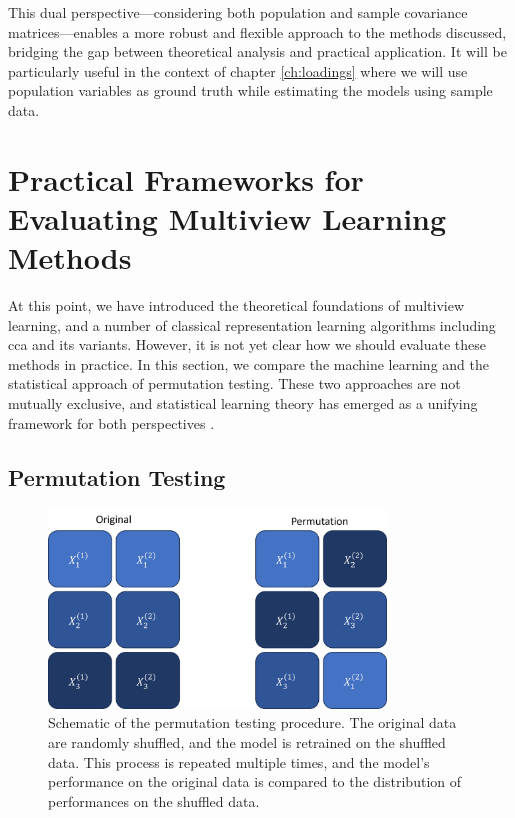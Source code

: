 This dual perspective—considering both population and sample covariance matrices—enables a more robust and flexible approach to the methods discussed, bridging the gap between theoretical analysis and practical application.
It will be particularly useful in the context of chapter \ref{ch:loadings} where we will use population variables as ground truth while estimating the models using sample data.


\section{Practical Frameworks for Evaluating Multiview Learning Methods}

At this point, we have introduced the theoretical foundations of multiview learning, and a number of classical representation learning algorithms including \acrshort{cca} and its variants.
However, it is not yet clear how we should evaluate these methods in practice.
In this section, we compare the machine learning and the statistical approach of permutation testing.
These two approaches are not mutually exclusive, and statistical learning theory has emerged as a unifying framework for both perspectives \citep{vapnik1999nature, hastie2009elements}.

\subsection{Permutation Testing}

\begin{figure}
    \centering
    \includegraphics[width=0.8\textwidth]{figures/permutation_test.png}
    \caption{Schematic of the permutation testing procedure. The original data are randomly shuffled, and the model is retrained on the shuffled data. This process is repeated multiple times, and the model's performance on the original data is compared to the distribution of performances on the shuffled data.}
    \label{fig:statistical-inference}
\end{figure}

